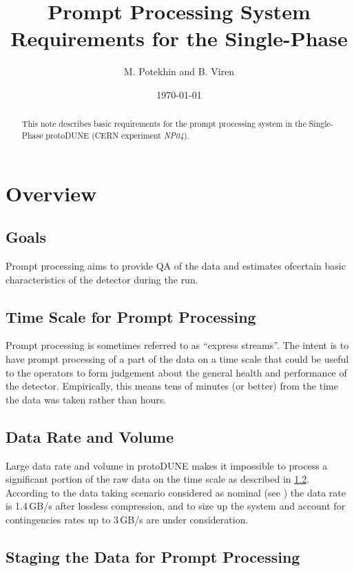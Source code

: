 \documentclass[pdftex,12pt,letter]{article}
\title{Prompt Processing System Requirements for the Single-Phase \pd}
\date{\today}
\author{M. Potekhin and B. Viren}
\newcommand{\pd}{protoDUNE\xspace}
\newcommand{\expname}{\textit{NP04}\xspace}
\begin{document}
\maketitle

\begin{abstract}
\noindent  This note describes basic requirements for the prompt processing system in the Single-Phase \pd
(CERN experiment \expname).
\end{abstract}

\section{Overview}
\subsection{Goals}
\label{sec:goals}
Prompt processing aims to provide QA of the data and estimates ofcertain  basic characteristics of the detector during the run.


\subsection{Time Scale for Prompt Processing}
\label{sec:timescale}
 Prompt processing is sometimes referred to as ``express streams''.
The intent is to have prompt processing of a part of the data on a time scale that could be useful to the operators to
form judgement about the general health and performance of the detector.
Empirically, this means tens of minutes (or better) from the time the data was taken rather than hours.

\subsection{Data Rate and Volume}
\label{sec:datavolume}
Large data rate and volume in \pd makes it impossible to process a significant portion of the raw data on the time scale as described in \ref{sec:timescale}.
According to the data taking scenario considered as nominal (see \cite{docdb1086}) the data rate is 1.4\,GB/s after lossless compression, and to size up
the system and account for contingencies rates up to 3\,GB/s are under consideration.

\subsection{Staging the Data for Prompt Processing}
\label{sec:datalocation}
\end{document}
